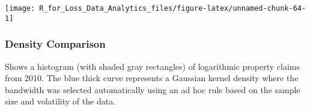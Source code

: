 \documentclass[]{book}
\newenvironment{Shaded}{\begin{snugshade}}{\end{snugshade}}
\newcommand{\KeywordTok}[1]{\textcolor[rgb]{0.13,0.29,0.53}{\textbf{#1}}}
\newcommand{\DataTypeTok}[1]{\textcolor[rgb]{0.13,0.29,0.53}{#1}}
\newcommand{\DecValTok}[1]{\textcolor[rgb]{0.00,0.00,0.81}{#1}}
\newcommand{\StringTok}[1]{\textcolor[rgb]{0.31,0.60,0.02}{#1}}
\newcommand{\CommentTok}[1]{\textcolor[rgb]{0.56,0.35,0.01}{\textit{#1}}}
\newcommand{\OperatorTok}[1]{\textcolor[rgb]{0.81,0.36,0.00}{\textbf{#1}}}
\newcommand{\NormalTok}[1]{#1}
\theoremstyle{definition}
\theoremstyle{definition}
\theoremstyle{definition}
\theoremstyle{remark}
\begin{document}
\begin{Shaded}
\end{Shaded}

\begin{center}\texttt{[image: R\_for\_Loss\_Data\_Analytics\_files/figure-latex/unnamed-chunk-64-1]} \end{center}

\subsubsection{Density Comparison}\label{density-comparison}

Shows a histogram (with shaded gray rectangles) of logarithmic property
claims from 2010. The blue thick curve represents a Gaussian kernel
density where the bandwidth was selected automatically using an ad hoc
rule based on the sample size and volatility of the data.
\end{document}
